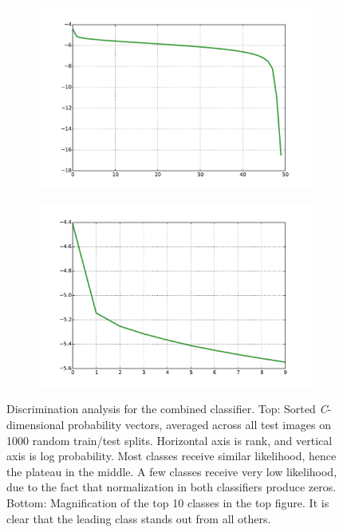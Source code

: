 \documentclass[11pt,a4paper]{article}
\begin{document}
\begin{figure}[htbp]
\centering
\begin{subfigure}
\centering
\includegraphics[scale=0.5]{combined_disc_all.pdf}
\end{subfigure}
\begin{subfigure}
\centering
\includegraphics[scale=0.5]{combined_disc_top.pdf}
\end{subfigure}
\caption{Discrimination analysis for the combined classifier. Top: Sorted \emph{C}-dimensional probability vectors, averaged across all test images on 1000 random train/test splits. Horizontal axis is rank, and vertical axis is log probability. Most classes receive similar likelihood, hence the plateau in the middle. A few classes receive very low likelihood, due to the fact that normalization in both classifiers produce zeros. Bottom: Magnification of the top 10 classes in the top figure. It is clear that the leading class stands out from all others.}
\label{fig:combined_disc}
\end{figure}
\end{document}
